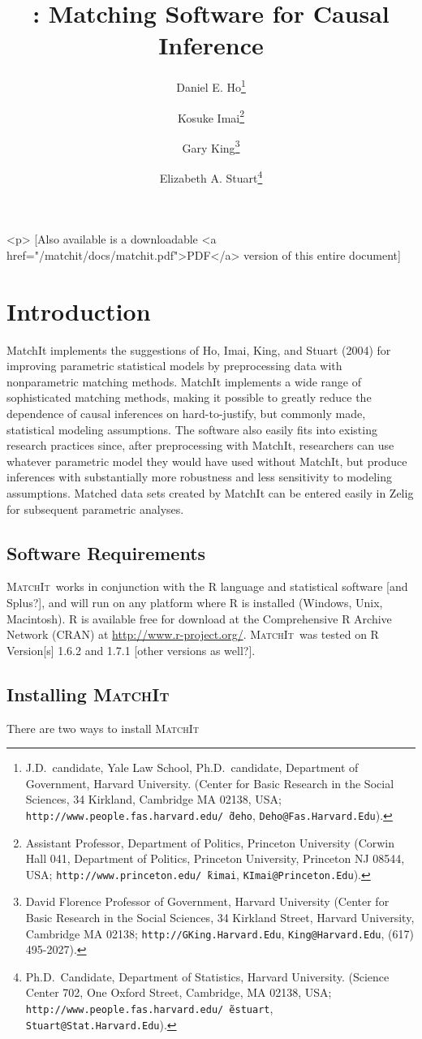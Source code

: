 \documentclass[oneside,letterpaper,titlepage]{article}
\title{\MatchIt : Matching Software for Causal Inference}
\author{Daniel E. Ho\thanks{J.D.\ candidate, Yale Law School, Ph.D.\
    candidate, Department of Government, Harvard
    University. (Center for Basic Research in the Social Sciences, 34
    Kirkland, Cambridge MA 02138, USA;
    \texttt{http://www.people.fas.harvard.edu/\~\,deho},
    \texttt{Deho@Fas.Harvard.Edu}).}
\and %
Kosuke Imai\thanks{Assistant Professor, Department of Politics, Princeton
    University (Corwin Hall 041, Department of Politics, Princeton
    University, Princeton NJ 08544, USA;
    \texttt{http://www.princeton.edu/\~\,kimai},
    \texttt{KImai@Princeton.Edu}).}
\and %
Gary King\thanks{David Florence Professor of Government, Harvard
  University (Center for Basic Research in the Social Sciences, 34
  Kirkland Street, Harvard University, Cambridge MA 02138;
  \texttt{http://GKing.Harvard.Edu}, \texttt{King@Harvard.Edu}, (617)
  495-2027).}
\and %
Elizabeth A. Stuart\thanks{Ph.D.\ Candidate, Department of Statistics, Harvard
  University. (Science Center 702, One Oxford Street, Cambridge, MA
  02138, USA;
  \texttt{http://www.people.fas.harvard.edu/\~\,estuart},
  \texttt{Stuart@Stat.Harvard.Edu}).}}
\newcommand{\MatchIt}{\textsc{MatchIt}}
\begin{document}
\maketitle

\begin{rawhtml}
<p>
  [Also available is a downloadable <a href="/matchit/docs/matchit.pdf">PDF</a>
  version of this entire document]
\end{rawhtml}

\tableofcontents

\section{Introduction}
MatchIt implements the suggestions of Ho, Imai, King, and Stuart
(2004) for improving parametric statistical models by preprocessing
data with nonparametric matching methods.  MatchIt implements a wide
range of sophisticated matching methods, making it possible to greatly
reduce the dependence of causal inferences on hard-to-justify, but
commonly made, statistical modeling assumptions.  The software also
easily fits into existing research practices since, after
preprocessing with MatchIt, researchers can use whatever parametric
model they would have used without MatchIt, but produce inferences
with substantially more robustness and less sensitivity to modeling
assumptions.  Matched data sets created by MatchIt can be entered
easily in Zelig for subsequent parametric analyses.


\subsection{Software Requirements} 
\MatchIt\ works in conjunction with the R language and statistical
software [and Splus?], and will run on any platform where R is
installed (Windows, Unix, Macintosh).  R is available free for
download at the Comprehensive R Archive Network (CRAN) at
\url{http://www.r-project.org/}.  \MatchIt\ was tested on R Version[s]
1.6.2 and 1.7.1 [other versions as well?].

\subsection{Installing \MatchIt} 

There are two ways to install \MatchIt\: 
\end{document}
